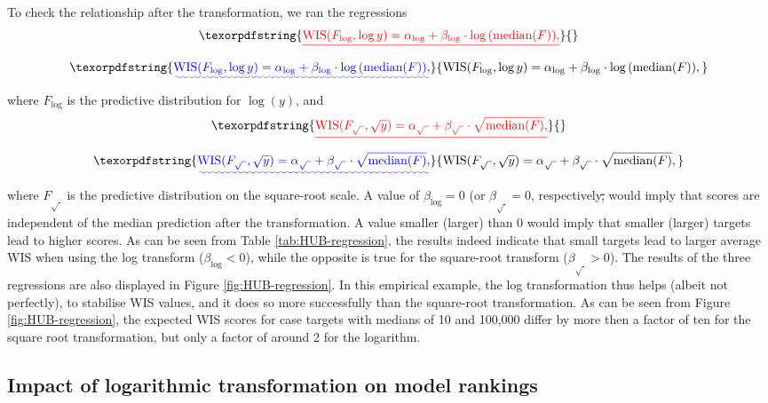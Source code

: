 \documentclass{article}
\providecommand{\DIFaddtex}[1]{{\protect\color{blue}\uwave{#1}}} %
\providecommand{\DIFdeltex}[1]{{\protect\color{red}\sout{#1}}}                      %
\providecommand{\DIFaddbegin}{} %
\providecommand{\DIFaddend}{} %
\providecommand{\DIFdelbegin}{} %
\providecommand{\DIFdelend}{} %
\providecommand{\DIFadd}[1]{\texorpdfstring{\DIFaddtex{#1}}{#1}} %
\providecommand{\DIFdel}[1]{\texorpdfstring{\DIFdeltex{#1}}{}} %
\newcommand{\DIFscaledelfig}{0.5}
\newlength{\DIFdelgraphicswidth} %
\newlength{\DIFdelgraphicsheight} %
\newcommand{\DIFaddincludegraphics}[2][]{{\color{blue}\fbox{\DIFOincludegraphics[#1]{#2}}}} %
\newcommand{\DIFdelincludegraphics}[2][]{%
\sbox{\DIFdelgraphicsbox}{\DIFOincludegraphics[#1]{#2}}%
\settoboxwidth{\DIFdelgraphicswidth}{\DIFdelgraphicsbox} %
\settoboxtotalheight{\DIFdelgraphicsheight}{\DIFdelgraphicsbox} %
\scalebox{\DIFscaledelfig}{%
\parbox[b]{\DIFdelgraphicswidth}{\usebox{\DIFdelgraphicsbox}\\[-\baselineskip] \rule{\DIFdelgraphicswidth}{0em}}\llap{\resizebox{\DIFdelgraphicswidth}{\DIFdelgraphicsheight}{%
\setlength{\unitlength}{\DIFdelgraphicswidth}%
\begin{picture}(1,1)%
\thicklines\linethickness{2pt} %
{\color[rgb]{1,0,0}\put(0,0){\framebox(1,1){}}}%
{\color[rgb]{1,0,0}\put(0,0){\line( 1,1){1}}}%
{\color[rgb]{1,0,0}\put(0,1){\line(1,-1){1}}}%
\end{picture}%
}\hspace*{3pt}}} %
} %
\DeclareRobustCommand{\DIFaddbegin}{\DIFOaddbegin \let\includegraphics\DIFaddincludegraphics} %
\DeclareRobustCommand{\DIFaddend}{\DIFOaddend \let\includegraphics\DIFOincludegraphics} %
\DeclareRobustCommand{\DIFdelbegin}{\DIFOdelbegin \let\includegraphics\DIFdelincludegraphics} %
\DeclareRobustCommand{\DIFdelend}{\DIFOaddend \let\includegraphics\DIFOincludegraphics} %
\begin{document}
To check the relationship after the transformation, we ran the regressions
\DIFdelbegin \begin{displaymath}
    \DIFdel{\text{WIS}(F_{\log}, \log y) = \alpha_{\log} + \beta_{\log} \cdot \log{(\text{median}(F))},
}\end{displaymath}%
\DIFdelend \DIFaddbegin \begin{equation}
    \DIFadd{\text{WIS}(F_{\log}, \log y) = \alpha_{\log} + \beta_{\log} \cdot \log{(\text{median}(F))},
}\end{equation}\DIFaddend 
where $F_{\log}$ is the predictive distribution for $\log(y)$, and
\DIFdelbegin \begin{displaymath}
    \DIFdel{\text{WIS}(F_{\sqrt{\ }}, \sqrt{y}) = \alpha_{\sqrt{\ }} + \beta_{\sqrt{\ }} \cdot \sqrt{\text{median}(F)},
}\end{displaymath}%
\DIFdelend \DIFaddbegin \begin{equation}
    \DIFadd{\text{WIS}(F_{\sqrt{\ }}, \sqrt{y}) = \alpha_{\sqrt{\ }} + \beta_{\sqrt{\ }} \cdot \sqrt{\text{median}(F)},
}\end{equation}\DIFaddend  
where $F_{\sqrt{\ }}$ is the predictive distribution on the square-root scale. A value of $\beta_{\log} = 0$ (or $\beta_{\sqrt{\ }} = 0$, respectively\DIFdelbegin \DIFdel{, }\DIFdelend \DIFaddbegin \DIFadd{) }\DIFaddend would imply that scores are \DIFaddbegin \DIFadd{linearly }\DIFaddend independent of the median prediction after the transformation. A value smaller (larger) than 0 would imply that smaller (larger) targets lead to higher scores. As can be seen from Table \ref{tab:HUB-regression}, the results indeed indicate that small targets lead to larger average WIS when using the log transform ($\beta_{\log} < 0$), while the opposite is true for the square-root transform ($\beta_{\sqrt{\ }} > 0$). The results of the three regressions are also displayed in Figure \ref{fig:HUB-regression}. In this empirical example, the log transformation thus helps (albeit not perfectly), to stabilise WIS values, and it does so more successfully than the square-root transformation. As can be seen from Figure \ref{fig:HUB-regression}, the expected WIS scores for case targets with medians of 10 and 100,000 differ by more then a factor of ten for the square root transformation, but only a factor of around 2 for the logarithm.

\subsection{Impact of logarithmic transformation on model rankings}
\DIFaddbegin \label{sec:Hub:cor}
\DIFaddend 
\end{document}
